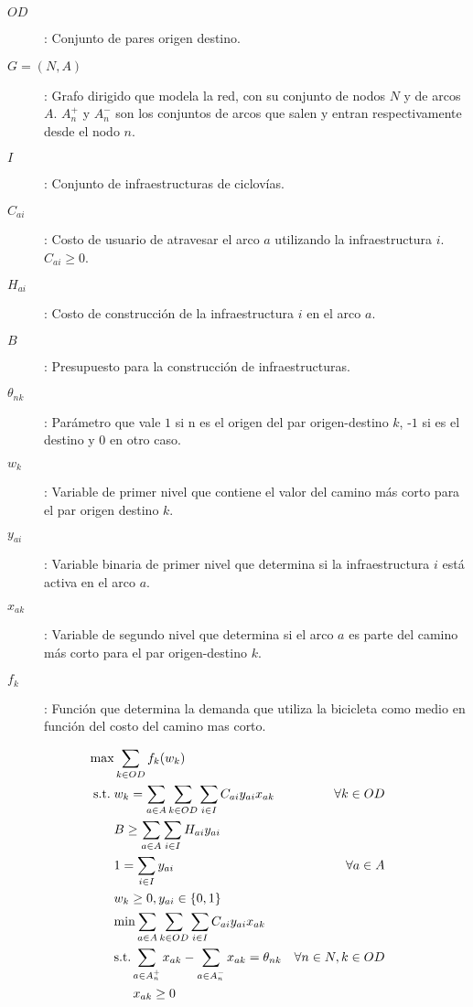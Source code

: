 \documentclass{article}
\newcommand{\modelspace}{\hspace{1.5em}}
\begin{document}
  \begin{description}
    \item[$OD$]: Conjunto de pares origen destino.
    \item[$G=(N,A)$]: Grafo dirigido que modela la red, con su conjunto de nodos $N$ y de arcos $A$. $A_n^+$ y $A_n^-$ son los conjuntos de arcos que salen y entran respectivamente desde el nodo $n$.
    \item[$I$]: Conjunto de infraestructuras de ciclovías.
    \item[$C_{ai}$]: Costo de usuario de atravesar el arco $a$ utilizando la infraestructura $i$. $C_{ai} \geq 0$.
    \item[$H_{ai}$]: Costo de construcción de la infraestructura $i$ en el arco $a$.
    \item[$B$]: Presupuesto para la construcción de infraestructuras.
    \item[$\theta_{nk}$]: Parámetro que vale $1$ si n es el origen del par origen-destino $k$, -$1$ si es el destino y $0$ en otro caso.
    \item[$w_k$]: Variable de primer nivel que contiene el valor del camino más corto para el par origen destino $k$.
    \item[$y_{ai}$]: Variable binaria de primer nivel que determina si la infraestructura $i$ está activa en el arco $a$.
    \item[$x_{ak}$]: Variable de segundo nivel que determina si el arco $a$ es parte del camino más corto para el par origen-destino $k$.
    \item[$f_k$]: Función que determina la demanda que utiliza la bicicleta como medio en función del costo del camino mas corto.
  \end{description}

  \begin{align}
    \text{max}    & \sum_{k \in OD} f_k(w_k)                                                         & \label{eq:objective1lvl} \\
    \text{s.t.}\; & w_k = \sum_{a \in A} \sum_{k \in OD} \sum_{i \in I} C_{ai}y_{ai}x_{ak}           & \forall k \in OD \label{eq:shortestpath} \\
                  & B \geq \sum_{a \in A} \sum_{i \in I} H_{ai}y_{ai}                                & \label{eq:respectbudget} \\
                  & 1 = \sum_{i \in I} y_{ai}                                                        & \forall a \in A \label{eq:alwaysoney} \\
                  & w_k \geq 0, y_{ai} \in \{0,1\}                                                   & \nonumber \\
                  & \text{min} \sum_{a \in A} \sum_{k \in OD} \sum_{i \in I} C_{ai}y_{ai}x_{ak}      & \label{eq:subproblem} \\
                  & \text{s.t.} \sum_{a \in A_n^+} x_{ak} - \sum_{a \in A_n^-} x_{ak} = \theta_{nk}  & \forall n \in N, k \in OD \label {eq:flowbalance} \\
                  & \modelspace x_{ak} \geq 0                                                        & \nonumber
  \end{align}
\end{document}
